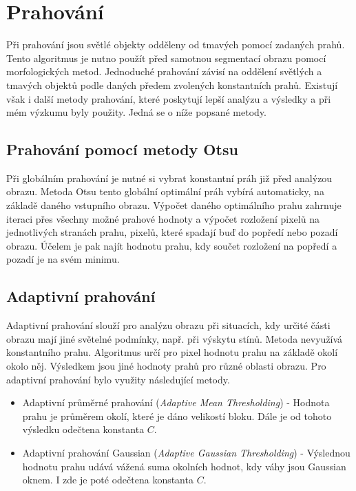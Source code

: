 \section{Prahování}
Při prahování jsou světlé objekty odděleny od tmavých pomocí zadaných prahů. Tento algoritmus je nutno použít před samotnou segmentací obrazu pomocí morfologických metod. Jednoduché prahování závisí na oddělení světlých a tmavých objektů podle daných předem zvolených konstantních prahů. Existují však i další metody prahování, které poskytují lepší analýzu a výsledky a při mém výzkumu byly použity. Jedná se o níže popsané metody.

\subsection*{Prahování pomocí metody Otsu}
Při globálním prahování je nutné si vybrat konstantní práh již před analýzou obrazu. Metoda Otsu tento globální optimální práh vybírá automaticky, na základě daného vstupního obrazu. \cite{OpenCVTresholding} Výpočet daného optimálního prahu zahrnuje iteraci přes všechny možné prahové hodnoty a výpočet rozložení pixelů na jednotlivých stranách prahu, pixelů, které spadají buď do popředí nebo pozadí obrazu. Účelem je pak najít hodnotu prahu, kdy součet rozložení na popředí a pozadí je na svém minimu. \cite{LabBookPagesTresholding}

\subsection*{Adaptivní prahování}
Adaptivní prahování slouží pro analýzu obrazu při situacích, kdy určité části obrazu mají jiné světelné podmínky, např. při výskytu stínů. Metoda nevyužívá konstantního prahu. Algoritmus určí pro pixel hodnotu prahu na základě okolí okolo něj. Výsledkem jsou jiné hodnoty prahů pro různé oblasti obrazu. Pro adaptivní prahování bylo využity následující metody. \cite{OpenCVTresholding}
\begin{itemize}
    \item Adaptivní průměrné prahování (\textit{Adaptive Mean Thresholding}) - Hodnota prahu je průměrem okolí, které je dáno velikostí bloku. Dále je od tohoto výsledku odečtena konstanta $C$.
    \item Adaptivní prahování Gaussian (\textit{Adaptive Gaussian Thresholding}) - Výslednou hodnotu prahu udává vážená suma okolních hodnot, kdy váhy jsou Gaussian oknem. I zde je poté odečtena konstanta $C$.
\end{itemize}

